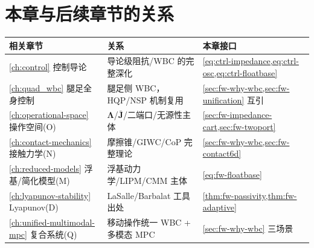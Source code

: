 \section*{本章与后续章节的关系}
\begin{table}[H]\centering\small
\begin{tabular}{lll}
\toprule
相关章节 & 关系 & 本章接口 \\
\midrule
\cref{ch:control} 控制导论 & 导论级阻抗/WBC 的完整深化 & \cref{eq:ctrl-impedance,eq:ctrl-osc,eq:ctrl-floatbase} \\
\cref{ch:quad_wbc} 腿足全身控制 & 腿足侧 WBC，HQP/NSP 机制复用 & \cref{sec:fw-why-wbc,sec:fw-unification} 互引 \\
\cref{ch:operational-space} 操作空间(O) & $\boldsymbol{\Lambda}$/$\bar{\mathbf{J}}$/二端口/无源性主体 & \cref{sec:fw-impedance-cart,sec:fw-twoport} \\
\cref{ch:contact-mechanics} 接触力学(N) & 摩擦锥/GIWC/CoP 完整理论 & \cref{sec:fw-why-wbc,sec:fw-contact6d} \\
\cref{ch:reduced-models} 浮基/简化模型(M) & 浮基动力学/LIPM/CMM 主体 & \cref{eq:fw-floatbase} \\
\cref{ch:lyapunov-stability} Lyapunov(D) & LaSalle/Barbalat 工具出处 & \cref{thm:fw-passivity,thm:fw-adaptive} \\
\cref{ch:unified-multimodal-mpc} 复合系统(Q) & 移动操作统一 WBC + 多模态 MPC & \cref{sec:fw-why-wbc} 三场景 \\
\bottomrule
\end{tabular}
\end{table}
